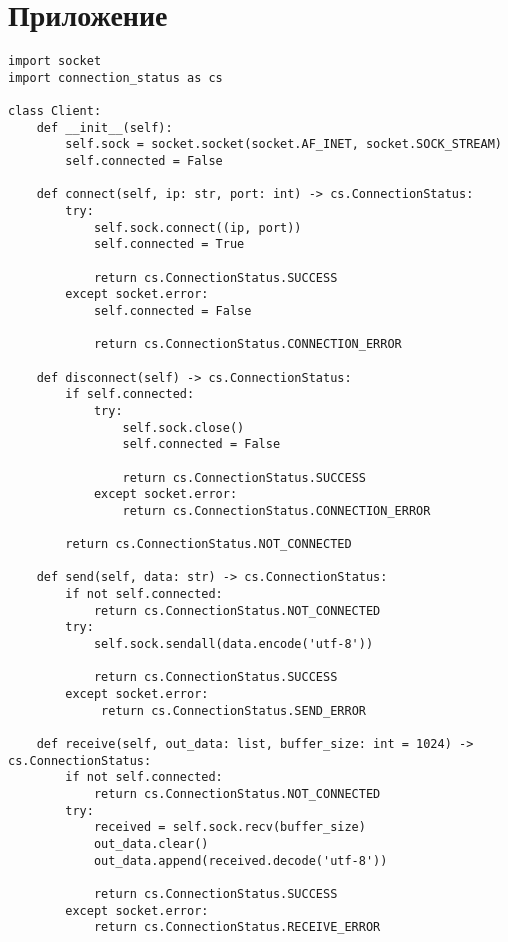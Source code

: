 \documentclass[a4paper,14pt]{extarticle}
\begin{document}
\section{Приложение}
\begin{lstlisting}[label=lst:client, caption={Основа для общения компьютера с роботом.}]
import socket
import connection_status as cs

class Client:
    def __init__(self):
        self.sock = socket.socket(socket.AF_INET, socket.SOCK_STREAM)
        self.connected = False

    def connect(self, ip: str, port: int) -> cs.ConnectionStatus:
        try:
            self.sock.connect((ip, port))
            self.connected = True

            return cs.ConnectionStatus.SUCCESS
        except socket.error:
            self.connected = False

            return cs.ConnectionStatus.CONNECTION_ERROR

    def disconnect(self) -> cs.ConnectionStatus:
        if self.connected:
            try:
                self.sock.close()
                self.connected = False

                return cs.ConnectionStatus.SUCCESS
            except socket.error:
                return cs.ConnectionStatus.CONNECTION_ERROR
        
        return cs.ConnectionStatus.NOT_CONNECTED

    def send(self, data: str) -> cs.ConnectionStatus:
        if not self.connected:
            return cs.ConnectionStatus.NOT_CONNECTED
        try:
            self.sock.sendall(data.encode('utf-8'))

            return cs.ConnectionStatus.SUCCESS
        except socket.error:
             return cs.ConnectionStatus.SEND_ERROR

    def receive(self, out_data: list, buffer_size: int = 1024) -> cs.ConnectionStatus:
        if not self.connected:
            return cs.ConnectionStatus.NOT_CONNECTED
        try:
            received = self.sock.recv(buffer_size)
            out_data.clear()
            out_data.append(received.decode('utf-8'))

            return cs.ConnectionStatus.SUCCESS
        except socket.error:
            return cs.ConnectionStatus.RECEIVE_ERROR
\end{lstlisting}
\end{document}
